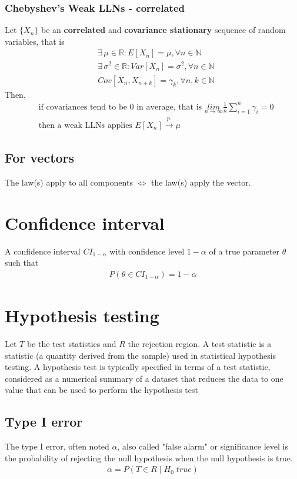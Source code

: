 \documentclass[../main.tex]{subfiles}
\begin{document}
\subsubsection{Chebyshev's Weak LLNs - correlated}
Let $\{X_n\}$ be an \textbf{correlated} and \textbf{covariance stationary} sequence of random variables, that is
\begin{align*}
    &\exists\, \mu \in \mathbb{R}: E[X_n] = \mu, \forall n \in \mathbb{N} \\
    &\exists\, \sigma^2 \in \mathbb{R}: Var[X_n] = \sigma^2, \forall n \in \mathbb{N} \\
    & Cov[X_n, X_{n+k}] = \gamma_k, \forall n,k \in \mathbb{N}
\end{align*}
Then, \\
\begin{align*}
    &\text{if covariances tend to be 0 in average, that is }\underset{n \to \infty}{lim} \frac{1}{n} \sum_{i=1}^{n} \gamma_i = 0 \\
    &\text{then a weak LLNs applies } E[X_n] \xrightarrow{p.} \mu
\end{align*}

\subsection{For vectors}
The law(s) apply to all components $\Longleftrightarrow$ the law(s) apply the vector.


\section{Confidence interval}
A confidence interval $CI_{1-\alpha}$ with confidence level $1-\alpha$ of a true parameter $\theta$
such that
\begin{align*}
    P(\theta \in CI_{1-\alpha}) = 1 - \alpha
\end{align*}

\section{Hypothesis testing}
Let $T$ be the test statistics and $R$ the rejection region.
A test statistic is a statistic (a quantity derived from the sample) used in statistical hypothesis testing.
A hypothesis test is typically specified in terms of a test statistic, considered as a numerical summary
of a dataset that reduces the data to one value that can be used to perform the hypothesis test

\subsection{Type I error}
The type I error, often noted $\alpha$, also called "false alarm" or significance level is the probability
of rejecting the null hypothesis when the null hypothesis is true.
\begin{align*}
    \alpha = P(T \in R\; |\; H_0\; true)
\end{align*}
\end{document}
